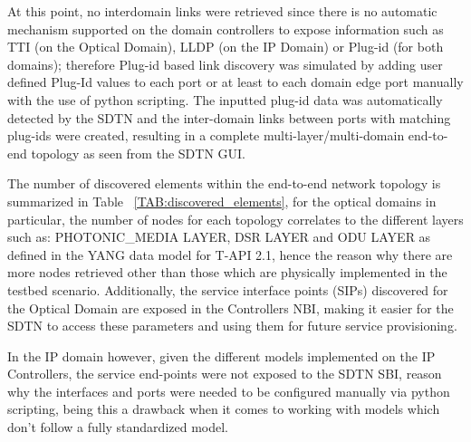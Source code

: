 \documentclass[a4paper,fleqn]{cas-dc}
\begin{document}
At this point, no interdomain links were retrieved since there is no automatic mechanism supported on the domain controllers to expose information such as TTI (on the Optical Domain), LLDP (on the IP Domain) or Plug-id (for both domains); therefore Plug-id based link discovery was simulated by adding user defined Plug-Id values to each port or at least to each domain edge port manually with the use of python scripting. The inputted plug-id data was automatically detected by the SDTN and the inter-domain links between ports with matching plug-ids were created, resulting in a complete multi-layer/multi-domain end-to-end topology as seen from the SDTN GUI.

The number of discovered elements within the end-to-end network topology is summarized in Table ~\ref{TAB:discovered_elements}, for the optical domains in particular, the number of nodes for each topology correlates to the different layers such as:
PHOTONIC\_MEDIA LAYER, DSR LAYER and ODU LAYER as defined in the YANG data model for T-API 2.1, hence the reason why there are more nodes retrieved other than those which are physically implemented in the testbed scenario. Additionally, the service interface points (SIPs) discovered for the Optical Domain are exposed in the Controllers NBI, making it easier for the SDTN to access these parameters and using them for future service provisioning. 

In the IP domain however, given the different models implemented on the IP Controllers, the service end-points were not exposed to the SDTN SBI, reason why the interfaces and ports were needed to be configured manually via python scripting, being this a drawback when it comes to working with models which don’t follow a fully standardized model.
\end{document}
